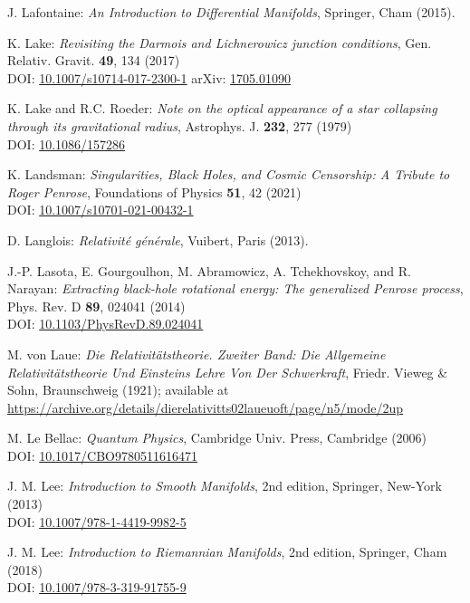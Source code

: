 \begin{thebibliography}{123}
J. Lafontaine: {\em An Introduction to Differential Manifolds},
Springer, Cham (2015).

K. Lake:
{\em Revisiting the Darmois and Lichnerowicz junction conditions},
Gen. Relativ. Gravit. {\bf 49}, 134 (2017)\\
DOI: \href{https://doi.org/10.1007/s10714-017-2300-1}{10.1007/s10714-017-2300-1}\hfill
arXiv: \href{https://arxiv.org/abs/1705.01090}{1705.01090}

K. Lake and R.C. Roeder:
{\em Note on the optical appearance of a star collapsing through its gravitational radius},
Astrophys. J. {\bf 232}, 277 (1979)\\
DOI: \href{https://doi.org/10.1086/157286}{10.1086/157286}

K. Landsman:
{\em Singularities, Black Holes, and Cosmic Censorship:
A Tribute to Roger Penrose},
Foundations of Physics {\bf 51}, 42 (2021)\\
DOI: \href{https://doi.org/10.1007/s10701-021-00432-1}{10.1007/s10701-021-00432-1}

D. Langlois: \emph{Relativit\'e g\'en\'erale},
Vuibert, Paris (2013).

J.-P. Lasota, E. Gourgoulhon, M. Abramowicz, A. Tchekhovskoy,
and R. Narayan:
{\em Extracting black-hole rotational energy: The generalized Penrose process},
Phys. Rev. D {\bf 89}, 024041 (2014)  \\
DOI: \href{https://doi.org/10.1103/PhysRevD.89.024041}{10.1103/PhysRevD.89.024041}

M. von Laue: {\em Die Relativitätstheorie. Zweiter Band: Die Allgemeine Relativitätstheorie Und Einsteins Lehre Von Der Schwerkraft},
Friedr. Vieweg \& Sohn, Braunschweig (1921); available at \\
\url{https://archive.org/details/dierelativitts02laueuoft/page/n5/mode/2up}

M. Le Bellac:
{\em Quantum Physics},
Cambridge Univ. Press, Cambridge (2006)\\
DOI: \href{https://doi.org/10.1017/CBO9780511616471}{10.1017/CBO9780511616471}

J. M. Lee: {\em Introduction to Smooth Manifolds}, 2nd edition,
Springer, New-York (2013)\\
DOI: \href{https://doi.org/10.1007/978-1-4419-9982-5}{10.1007/978-1-4419-9982-5}

J. M. Lee: {\em Introduction to Riemannian Manifolds}, 2nd edition,
Springer, Cham (2018)\\
DOI: \href{https://doi.org/10.1007/978-3-319-91755-9}{10.1007/978-3-319-91755-9}


\end{thebibliography}
